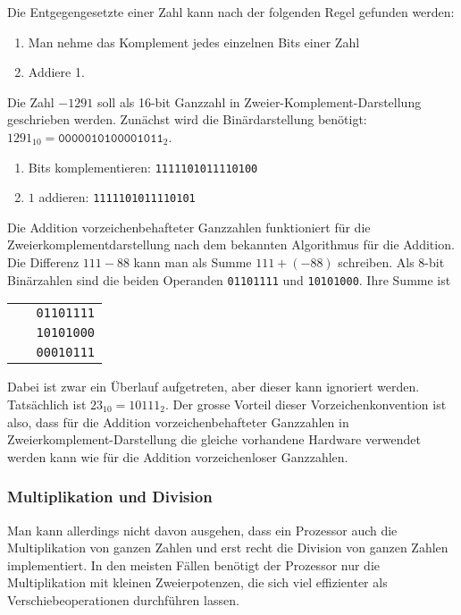 Die Entgegengesetzte einer Zahl kann nach der folgenden Regel gefunden werden:
\begin{enumerate}
\item Man nehme das Komplement jedes einzelnen Bits einer Zahl
\item Addiere 1.
\end{enumerate}
\begin{beispiel}
Die Zahl $-1291$ soll als 16-bit Ganzzahl in Zweier-Komplement-Darstellung
geschrieben werden.
Zunächst wird die Binärdarstellung benötigt:
$1291_{10}= \texttt{0000010100001011}_2$.
\begin{enumerate}
\item Bits komplementieren: \texttt{1111101011110100}
\item $1$ addieren: \texttt{1111101011110101}
\qedhere
\end{enumerate}
\end{beispiel}

Die Addition vorzeichenbehafteter Ganzzahlen funktioniert für die
Zweierkomplementdarstellung nach dem bekannten Algorithmus für die
Addition.
Die Differenz $111-88$ kann man als Summe $111+(-88)$ schreiben.
Als 8-bit Binärzahlen sind die beiden Operanden
\texttt{01101111} und \texttt{10101000}.
Ihre Summe ist
\begin{center}
\begin{tabular}{>{\tt}r}
01101111\\
10101000\\
\hline
{\color{gray}}\,
00010111\\
\end{tabular}
\end{center}
Dabei ist zwar ein Überlauf aufgetreten, aber dieser kann ignoriert
werden.
Tatsächlich ist $23_{10}=10111_2$.
Der grosse Vorteil dieser Vorzeichenkonvention ist also, dass
für die Addition vorzeichenbehafteter Ganzzahlen in
Zweierkomplement-Darstellung die gleiche vorhandene Hardware verwendet
werden kann wie für die Addition vorzeichenloser Ganzzahlen.

\subsubsection{Multiplikation und Division}
Man kann allerdings nicht davon ausgehen, dass ein Prozessor auch
die Multiplikation von ganzen Zahlen und erst recht die Division
von ganzen Zahlen implementiert.
In den meisten Fällen benötigt der Prozessor nur die Multiplikation
mit kleinen Zweierpotenzen, die sich viel effizienter als
Verschiebeoperationen durchführen lassen.

